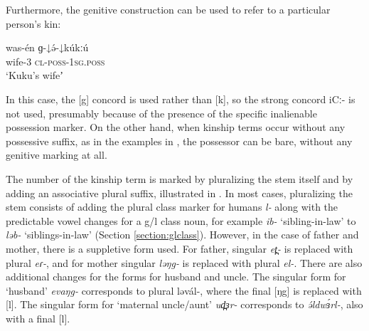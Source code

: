 Furthermore, the genitive construction can be used to refer to a particular person’s kin:

\ea \gll was-én ɡ-↓ə́-↓kúkːú \\
wife-3 \textsc{cl}-\textsc{poss}-1\textsc{sg}.\textsc{poss} \\
\glt ‘Kuku's wifeʼ
\z 

In this case, the [g] concord is used rather than [k], so the strong concord iCː- is not used, presumably because of the presence of the specific inalienable possession marker. On the other hand, when kinship terms occur without any possessive suffix, as in the examples in , the possessor can be bare, without any genitive marking at all.

The number of the kinship term is marked by pluralizing the stem itself and by adding an associative plural suffix, illustrated in . In most cases, pluralizing the stem consists of adding the plural class marker for humans \textit{l-} along with the predictable vowel changes for a g/l class noun, for example \textit{ib-} `sibling-in-law' to \textit{ləb-} `siblings-in-law' (Section \ref{section:glclass}). However, in the case of father and mother, there is a suppletive form used. For father, singular \textit{et̪-} is replaced with plural \textit{eɾ-}, and for mother singular \textit{ləŋg-} is replaced with plural \textit{el-}. There are also additional changes for the forms for husband and uncle. The singular form for `husband’ \textit{evaŋg-} corresponds to plural ləvál-, where the final [ŋg] is replaced with [l]. The singular form for `maternal uncle/aunt’ \textit{ud̪ɜr-} corresponds to \textit{ə́ldwɜ́rl-}, also with a final [l]. 
	
